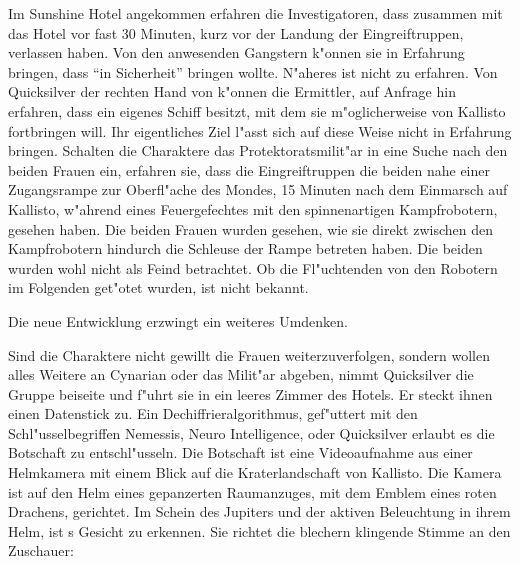 Im Sunshine Hotel angekommen erfahren die Investigatoren, dass \xl{} zusammen mit \ml{} das Hotel vor fast 30 Minuten, kurz vor der Landung der Eingreiftruppen, verlassen haben. Von den anwesenden Gangstern k"onnen sie in Erfahrung bringen, dass \xl{} \ml{} "`in Sicherheit"' bringen wollte. N"aheres ist nicht zu erfahren. Von Quicksilver der rechten Hand von \xl{} k"onnen die Ermittler, auf Anfrage hin erfahren, dass \xl{} ein eigenes Schiff besitzt, mit dem sie m"oglicherweise \ml{} von Kallisto fortbringen will. Ihr eigentliches Ziel l"asst sich auf diese Weise nicht in Erfahrung bringen. Schalten die Charaktere das Protektoratsmilit"ar in eine Suche nach den beiden Frauen ein, erfahren sie, dass die Eingreiftruppen die beiden nahe einer Zugangsrampe zur Oberfl"ache des Mondes, 15 Minuten nach dem Einmarsch auf Kallisto, w"ahrend eines Feuergefechtes mit den spinnenartigen Kampfrobotern, gesehen haben. Die beiden Frauen wurden gesehen, wie sie direkt zwischen den Kampfrobotern hindurch die Schleuse der Rampe betreten haben. Die beiden wurden wohl nicht als Feind betrachtet. Ob die Fl"uchtenden von den Robotern im Folgenden get"otet wurden, ist nicht bekannt.

Die neue Entwicklung erzwingt ein weiteres Umdenken.

Sind die Charaktere nicht gewillt die Frauen weiterzuverfolgen, sondern wollen alles Weitere an Cynarian oder das Milit"ar abgeben, nimmt Quicksilver die Gruppe beiseite und f"uhrt sie in ein leeres Zimmer des Hotels. Er steckt ihnen einen Datenstick zu.  Ein Dechiffrieralgorithmus, gef"uttert mit den Schl"usselbegriffen Nemessis, Neuro Intelligence, \xl{} oder Quicksilver erlaubt es die Botschaft zu entschl"usseln. Die Botschaft ist eine Videoaufnahme aus einer Helmkamera mit einem Blick auf die Kraterlandschaft von Kallisto. Die Kamera ist auf den Helm eines gepanzerten Raumanzuges, mit dem Emblem eines roten Drachens, gerichtet. Im Schein des Jupiters und der aktiven Beleuchtung in ihrem Helm, ist \xl{}s Gesicht zu erkennen. Sie richtet die blechern klingende Stimme an den Zuschauer:


